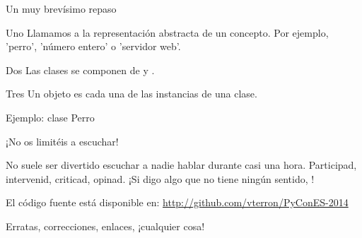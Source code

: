 \begin{frame}{Un muy brevísimo repaso}
  \small
  \begin{block}{\centering Uno}
    \centering
    Llamamos  a la representación abstracta de un
    concepto. Por ejemplo, 'perro', 'número entero' o 'servidor web'.
  \end{block}

  \begin{block}{\centering Dos}
    \centering
    Las clases se componen de  y
    .
  \end{block}

  \begin{block}{\centering Tres}
    \centering
    Un objeto es cada una de las instancias de una clase.
  \end{block}
\end{frame}

\begin{frame}{Ejemplo: clase Perro}
\end{frame}

\begin{frame}{¡No os limitéis a escuchar!}
  \begin{center}
    No suele ser divertido escuchar a nadie hablar durante casi una
    hora. Participad, intervenid, criticad, opinad. ¡Si digo algo que
    no tiene ningún sentido, !
  \end{center}

  \begin{block}{\centering El código fuente está disponible en:}
    \centering \url{http://github.com/vterron/PyConES-2014}
  \end{block}

  \begin{center}
    \small Erratas, correcciones, enlaces, ¡cualquier cosa!
  \end{center}
\end{frame}
